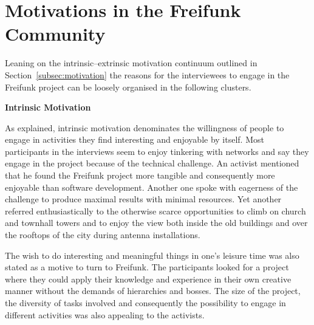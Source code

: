 \section{Motivations in the Freifunk Community}

\begin{comment}
\begin{itemize}
  \item is the focus of the paper;
  \item only pull up the foss motivations as comparison to underline similarities and differences with the foundings here
  \item general part of the questionnaire $\rightarrow$ cluster answers
  \item some graphs/tables on the specific questions
\end{itemize}
\end{comment}

Leaning on the intrinsic--extrinsic motivation continuum outlined in Section~\ref{subsec:motivation} the reasons for the interviewees to engage in the Freifunk project can be loosely organised in the following clusters.

\textbf{Intrinsic Motivation}

As explained, intrinsic motivation denominates the willingness of people to engage in activities they find interesting and enjoyable by itself.
Most participants in the interviews seem to enjoy tinkering with networks and say they engage in the project because of the technical challenge.
An activist mentioned that he found the Freifunk project more tangible and consequently more enjoyable than software development.
Another one spoke with eagerness of the challenge to produce maximal results with minimal resources.
Yet another referred enthusiastically to the otherwise scarce opportunities to climb on church and townhall towers and to enjoy the view both inside the old buildings and over the rooftops of the city during antenna installations.

The wish to do interesting and meaningful things in one's leisure time was also stated as a motive to turn to Freifunk.
The participants looked for a project where they could apply their knowledge and experience in their own creative manner without the demands of hierarchies and bosses.
The size of the project, the diversity of tasks involved and consequently the possibility to engage in different activities was also appealing to the activists.

